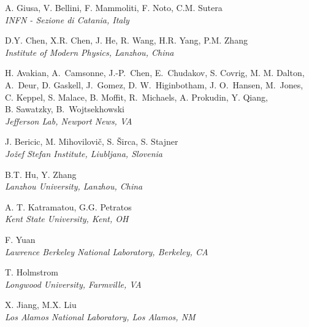 \documentclass[12pt]{article}
\begin{document}
\begin{center}
\large{A. Giusa, V. Bellini, F. Mammoliti, F. Noto, C.M. Sutera }\\
\it{INFN - Sezione di Catania, Italy}
\end{center}

\begin{center}
\large{D.Y. Chen, X.R. Chen, J. He, R. Wang, H.R. Yang, P.M. Zhang}\\
\it{Institute of Modern Physics, Lanzhou, China}
\end{center}

\begin{center}
\large{H. Avakian, A.~Camsonne, J.-P.~Chen, E.~Chudakov, S. Covrig, M. M. Dalton, \\
A.~Deur, D. Gaskell, J.~Gomez,  D. W.~Higinbotham, J. O.~Hansen, M.~Jones, \\
C. Keppel, S. Malace, B. Moffit, R.~Michaels, A. Prokudin, Y. Qiang, \\
B. Sawatzky,  B.~Wojtsekhowski}\\
\it{Jefferson Lab, Newport News, VA}
\end{center}

\begin{center}
\large{J. Bericic, M. Mihovilovi\v{c}, S. \v{S}irca, S. Stajner}\\
\it{Jo\v{z}ef Stefan Institute, Liubljana, Slovenia}
\end{center}

\begin{center}
\large {B.T. Hu, Y. Zhang}\\
\it{Lanzhou University, Lanzhou, China}
\end{center}

\begin{center}
\large {A. T. Katramatou, G.G. Petratos}\\
\it{Kent State University, Kent, OH}
\end{center}

\begin{center}
\large{F. Yuan} \\
\it{Lawrence Berkeley National Laboratory, Berkeley, CA}
\end{center}

\begin{center}
\large{T. Holmstrom} \\
\it{Longwood University, Farmville, VA}
\end{center}


\begin{center}
\large{X. Jiang, M.X. Liu}\\
\it{Los Alamos National Laboratory, Los Alamos, NM}
\end{center}
\end{document}
